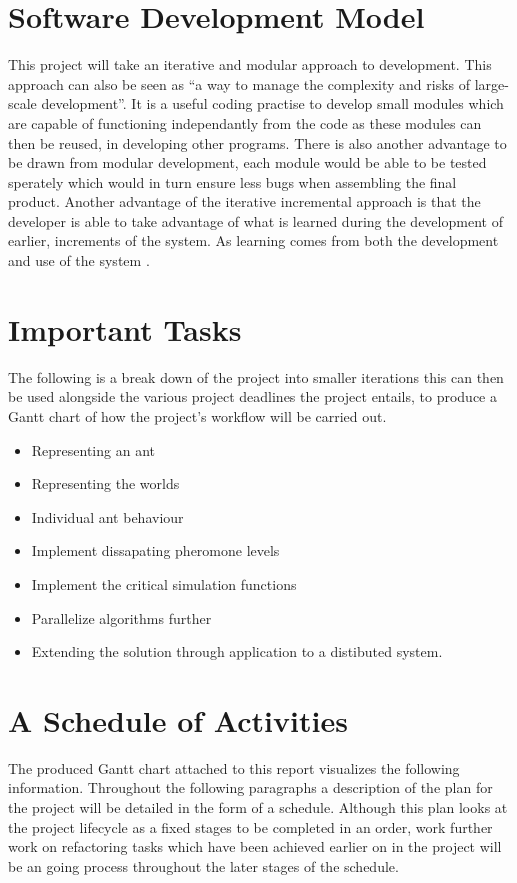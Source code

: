 \documentclass[main.tex]{subfiles}
\begin{document}
\section{Software Development Model}
This project will take an iterative and modular approach to development. This approach can also be seen as ``a way to manage the complexity and risks of large-scale development''\cite{Larman2003}.  It is a useful coding practise to develop small modules which are capable of functioning independantly from the code as these modules can then be reused, in developing other programs. There is also another advantage to be drawn from modular development, each module would be able to be tested sperately which would in turn ensure less bugs when assembling the final product. Another advantage of the iterative incremental approach is that the developer is able to take advantage of what is learned during the development of earlier, increments of the system. As learning comes from both the development and use of the system \cite{Larman2003}.

\section{Important Tasks}
The following is a break down of the project into smaller iterations this can then be used alongside the various project deadlines the project entails, to produce a Gantt chart of how the project's workflow will be carried out.
\begin{itemize}
	\item Representing an ant
	\item Representing the worlds
	\item Individual ant behaviour
        \item Implement dissapating pheromone levels
	\item Implement the critical simulation functions
	\item Parallelize algorithms further
	\item Extending the solution through application to a distibuted system.
\end{itemize}

\section{A Schedule of Activities}
The produced Gantt chart attached to this report visualizes the following information. Throughout the following paragraphs a description of the plan for the project will be detailed in the form of a schedule. Although this plan looks at the project lifecycle as a fixed stages to be completed in an order, work further work on refactoring tasks which have been achieved earlier on in the project will be an going process throughout the later stages of the schedule.
\end{document}

